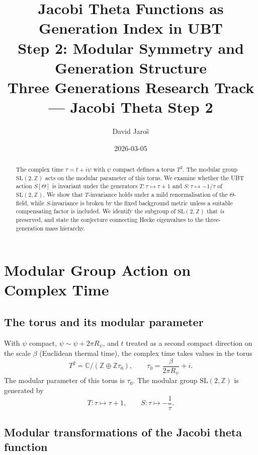 \documentclass[12pt,a4paper]{article}
\title{%
  Jacobi Theta Functions as Generation Index in UBT\\
  Step 2: Modular Symmetry and Generation Structure\\
  \large Three Generations Research Track --- Jacobi Theta Step 2
}
\author{David Jaro\v{s}}
\date{2026-03-05}
\theoremstyle{remark}
\newcommand{\C}{\mathbb{C}}
\newcommand{\Z}{\mathbb{Z}}
\newcommand{\SL}{\mathrm{SL}}
\begin{document}
\maketitle

\begin{abstract}
The complex time $\tau = t + i\psi$ with $\psi$ compact defines a torus
$T^2$.  The modular group $\SL(2,\Z)$ acts on the modular parameter of
this torus.  We examine whether the UBT action $S[\Theta]$ is invariant
under the generators $T: \tau\mapsto\tau+1$ and $S: \tau\mapsto-1/\tau$
of $\SL(2,\Z)$.  We show that $T$-invariance holds under a mild
renormalisation of the $\Theta$-field, while $S$-invariance is broken
by the fixed background metric unless a suitable compensating factor is
included.  We identify the subgroup of $\SL(2,\Z)$ that \emph{is}
preserved, and state the conjecture connecting Hecke eigenvalues to the
three-generation mass hierarchy.
\end{abstract}

\tableofcontents

\section{Modular Group Action on Complex Time}
\label{sec:modular_action}

\subsection{The torus and its modular parameter}

With $\psi$ compact, $\psi\sim\psi+2\pi R_\psi$, and $t$ treated as a
second compact direction on the scale $\beta$ (Euclidean thermal time),
the complex time takes values in the torus
\begin{equation}
  T^2 = \C/({\Z \oplus \Z\tau_0}),
  \qquad \tau_0 = \frac{\beta}{2\pi R_\psi} + i.
\end{equation}
The modular parameter of this torus is $\tau_0$.  The modular group
$\SL(2,\Z)$ is generated by
\begin{equation}
  T: \tau \mapsto \tau + 1,
  \qquad
  S: \tau \mapsto -\frac{1}{\tau}.
\end{equation}

\subsection{Modular transformations of the Jacobi theta function}
\end{document}
